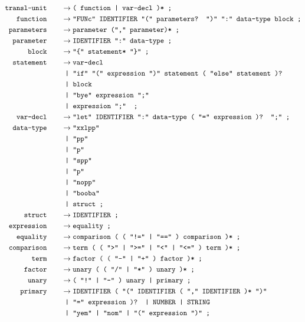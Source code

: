 \documentclass[12pt, a4paper]{article}
\newcommand{\ttt}[1]{
    \text{\texttt{#1}}
}
\newcommand{\ebnfnode}[2]{%
    #1\hspace{20px} &\to #2\ttt{ ;}\\
}
\newcommand{\ebnfnodett}[2]{%
    \ebnfnode{\ttt{#1}}{\ttt{#2}}
}
\begin{document}
    \begin{align*}
        \ebnfnodett{transl-unit}{( function | var-decl )*}
        \ebnfnodett{function}{"FUNc" IDENTIFIER "(" parameters? ")" ":" data-type block}
        \ebnfnodett{parameters}{parameter ("," parameter)*}
        \ebnfnodett{parameter}{IDENTIFIER ":" data-type}
        \ebnfnodett{block}{"\{" statement* "\}"}
        \ebnfnode{\ttt{statement}}
        {%
            \ttt{var-decl}\\
            &\ttt{ | "if" "(" expression ")" statement ( "else" statement )?}\\
            &\ttt{ | block }\\
            &\ttt{ | "bye" expression ";" }\\
            &\ttt{ | expression ";" }
        }
        \ebnfnodett{var-decl}{"let" IDENTIFIER ":" data-type ( "=" expression )? ";"}
        \ebnfnode{\ttt{data-type}}
        {%
            \ttt{"xxlpp"}\\
            &\ttt{ | "pp"}\\
            &\ttt{ | "p"}\\
            &\ttt{ | "spp"}\\
            &\ttt{ | "p"}\\
            &\ttt{ | "nopp"}\\
            &\ttt{ | "booba"}\\
            &\ttt{ | struct}
        }
        \ebnfnodett{struct}{IDENTIFIER}
        \ebnfnodett{expression}{equality}
        \ebnfnodett{equality}{comparison ( ( "!=" | "==" ) comparison )*}
        \ebnfnodett{comparison}{term ( ( ">" | ">=" | "<" | "<=" ) term )*}
        \ebnfnodett{term}{factor ( ( "-" | "+" ) factor )*}
        \ebnfnodett{factor}{unary ( ( "/" | "*" ) unary )*}
        \ebnfnodett{unary}{( "!" | "-" ) unary | primary}
        \ebnfnode{\ttt{primary}}
        {%
            \ttt{IDENTIFIER ( "(" IDENTIFIER ( "," IDENTIFIER )* ")"}\\
            &\ttt{ | "=" expression )? | NUMBER | STRING}\\
            &\ttt{ | "yem" | "nom" | "(" expression ")"}
        }
    \end{align*}
\end{document}
